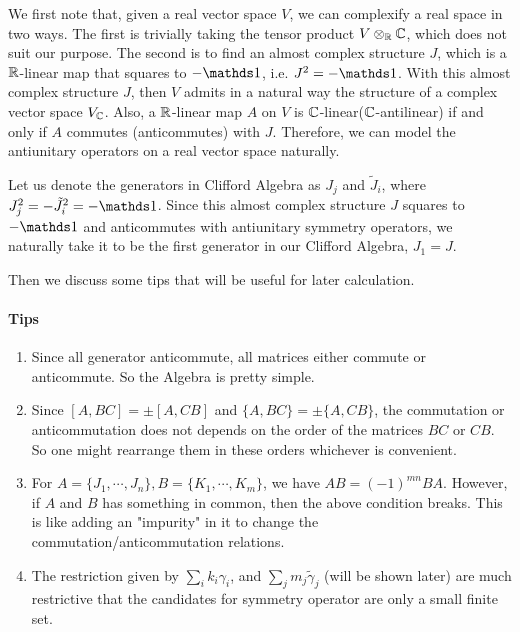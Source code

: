 We first note that, given a real vector space $V$, we can complexify a real space in
two ways. The first is trivially taking the tensor product $V\otimes_{\mathbb{R}} \mathbb{C}$,
which does not suit our purpose. The second is to find an almost complex
structure $J$, which is a $\mathbb{R}$-linear map that squares to $-\id$, i.e.
$J^2=-\id$. With this almost complex structure $J$, then $V$ admits in a natural
way the structure of a complex vector space $V_{\mathbb{C}}$\cite{DanielHuybrechts2005}. Also, a
$\mathbb{R}$-linear map $A$ on $V$ is $\mathbb{C}$-linear($\mathbb{C}$-antilinear) if and only if $A$
commutes (anticommutes) with $J$. Therefore, we can model the antiunitary
operators on a real vector space naturally.

Let us denote the generators in Clifford Algebra as $J_j$ and $\tilde{J}_i$,
where $J_j^2=-\tilde{J}_i^2 =-\id$. Since this almost complex structure $J$
squares to $-\id$ and anticommutes with antiunitary symmetry operators, we
naturally take it to be the first generator in our Clifford Algebra, $J_1=J$.

Then we discuss some tips that will be useful for later calculation.
\paragraph{Tips}
\begin{enumerate}
    \item Since all generator anticommute, all matrices either commute or
        anticommute. So the Algebra is pretty simple.
    \item Since $[A,BC] = \pm[A,CB]$ and $\{A,BC\}=\pm\{A,CB\}$, the commutation
        or anticommutation does not depends on the order of the matrices $BC$ or
        $CB$. So one might rearrange them in these orders whichever is convenient.
    \item For $A=\{J_1,\cdots,J_n\},B=\{K_1,\cdots,K_m\}$, we have $AB=(-1)^{mn}
        BA$. However, if $A$ and $B$ has something in common, then the above
        condition breaks. This is like adding an "impurity" in it to change the
        commutation/anticommutation relations.
    \item The restriction given by $\sum_i k_i \gamma_i$, and $\sum_j m_j
        \tilde{\gamma}_j$ (will be shown later) are much restrictive that the
        candidates for symmetry operator are only a small finite set.
        \label{enum:tips-4}
\end{enumerate}

